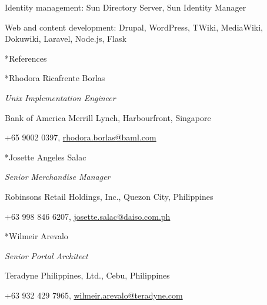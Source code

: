 \documentclass[10pt, a4paper, final]{article}
\begin{document}
\begin{section}
\begin{subsection}
\begin{compactitem}
      \item Identity management: Sun Directory Server, Sun Identity Manager
      \item Web and content development: Drupal, WordPress, TWiki, MediaWiki, Dokuwiki, Laravel, Node.js, Flask
    \end{compactitem}
  \end{subsection}
\end{section}
\vspace{1em}

\begin{section}*{References}
  \begin{subsection}*{Rhodora Ricafrente Borlas}
    \begin{compactitem}
      \item[] \textit{Unix Implementation Engineer}
      \item[] Bank of America Merrill Lynch, Harbourfront, Singapore
      \item[] +65 9002 0397, \href{mailto:rhodora.borlas@baml.com}{rhodora.borlas@baml.com}
    \end{compactitem}
  \end{subsection}

  \begin{subsection}*{Josette Angeles Salac}
    \begin{compactitem}
      \item[] \textit{Senior Merchandise Manager}
      \item[] Robinsons Retail Holdings, Inc., Quezon City, Philippines
      \item[] +63 998 846 6207, \href{mailto:josette.salac@daiso.com.ph}{josette.salac@daiso.com.ph}
    \end{compactitem}
  \end{subsection}

  \begin{subsection}*{Wilmeir Arevalo}
    \begin{compactitem}
      \item[] \textit{Senior Portal Architect}
      \item[] Teradyne Philippines, Ltd., Cebu, Philippines
      \item[] +63 932 429 7965, \href{mailto:wilmeir.arevalo@teradyne.com}{wilmeir.arevalo@teradyne.com}
    \end{compactitem}
  \end{subsection}
\end{section}
\vspace{1em}
\end{document}
